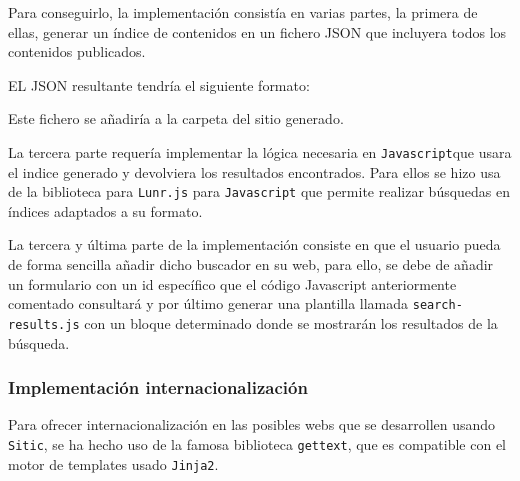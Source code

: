 Para conseguirlo, la implementación consistía en varias partes, la primera de ellas, generar un índice de contenidos
en un fichero JSON que incluyera todos los contenidos publicados.

EL JSON resultante tendría el siguiente formato:

\begin{jsoncode}
\end{jsoncode}

Este fichero se añadiría a la carpeta del sitio generado.

La tercera parte requería implementar la lógica necesaria en \texttt{Javascript}que usara el indice generado
y devolviera los resultados encontrados. Para ellos se hizo usa de la biblioteca para \texttt{Lunr.js} para
\texttt{Javascript} que permite realizar búsquedas en índices adaptados a su formato.

La tercera y última parte de la implementación consiste en que el usuario pueda de forma sencilla añadir dicho buscador en
su web, para ello, se debe de añadir un formulario con un id específico que el código Javascript anteriormente
comentado consultará y por último generar una plantilla llamada \texttt{search-results.js} con un bloque
determinado donde se mostrarán los resultados de la búsqueda.

\subsubsection{Implementación internacionalización}

Para ofrecer internacionalización en las posibles webs que se desarrollen usando \texttt{Sitic}, se ha hecho uso
de la famosa biblioteca \texttt{gettext}, que es compatible con el motor de templates usado \texttt{Jinja2}.

